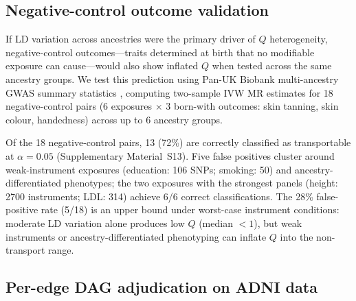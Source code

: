 \documentclass[11pt]{article}
\begin{document}
\subsection{Negative-control outcome validation}
\label{sec:realdata-negative-control}

If LD variation across ancestries were the primary driver of $Q$ heterogeneity, negative-control outcomes---traits determined at birth that no modifiable exposure can cause---would also show inflated $Q$ when tested across the same ancestry groups.
We test this prediction using Pan-UK Biobank multi-ancestry GWAS summary statistics \citep{karczewski2025panukb}, computing two-sample IVW MR estimates for 18 negative-control pairs (6 exposures $\times$ 3 born-with outcomes: skin tanning, skin colour, handedness) across up to 6 ancestry groups.

Of the 18 negative-control pairs, 13 (72\%) are correctly classified as transportable at $\alpha = 0.05$ (Supplementary Material~S13). Five false positives cluster around weak-instrument exposures (education: 106 SNPs; smoking: 50) and ancestry-differentiated phenotypes; the two exposures with the strongest panels (height: 2700 instruments; LDL: 314) achieve 6/6 correct classifications. The 28\% false-positive rate (5/18) is an upper bound under worst-case instrument conditions: moderate LD variation alone produces low $Q$ (median $< 1$), but weak instruments or ancestry-differentiated phenotyping can inflate $Q$ into the non-transport range.

\subsection{Per-edge DAG adjudication on ADNI data}
\label{sec:realdata-dag}
\end{document}
